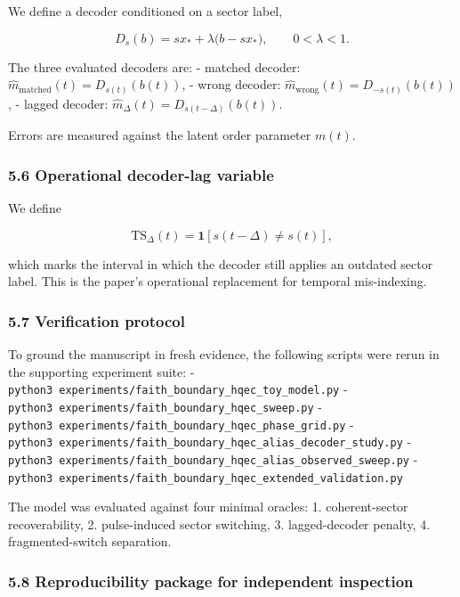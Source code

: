 \documentclass[
]{article}
\begin{document}
We define a decoder conditioned on a sector label,

\[
D_s(b)=s x_* + \lambda\big(b-sx_*\big), \qquad 0<\lambda<1.
\]

The three evaluated decoders are: - matched decoder:
\(\hat m_{\mathrm{matched}}(t)=D_{s(t)}(b(t))\), - wrong decoder:
\(\hat m_{\mathrm{wrong}}(t)=D_{-s(t)}(b(t))\), - lagged decoder:
\(\hat m_\Delta(t)=D_{s(t-\Delta)}(b(t))\).

Errors are measured against the latent order parameter \(m(t)\).

\subsubsection{5.6 Operational decoder-lag
variable}\label{operational-decoder-lag-variable}

We define

\[
\mathrm{TS}_\Delta(t)=\mathbf{1}[s(t-\Delta)\neq s(t)],
\]

which marks the interval in which the decoder still applies an outdated
sector label. This is the paper's operational replacement for temporal
mis-indexing.

\subsubsection{5.7 Verification protocol}\label{verification-protocol}

To ground the manuscript in fresh evidence, the following scripts were
rerun in the supporting experiment suite: -
\texttt{python3\ experiments/faith\_boundary\_hqec\_toy\_model.py} -
\texttt{python3\ experiments/faith\_boundary\_hqec\_sweep.py} -
\texttt{python3\ experiments/faith\_boundary\_hqec\_phase\_grid.py} -
\texttt{python3\ experiments/faith\_boundary\_hqec\_alias\_decoder\_study.py}
-
\texttt{python3\ experiments/faith\_boundary\_hqec\_alias\_observed\_sweep.py}
-
\texttt{python3\ experiments/faith\_boundary\_hqec\_extended\_validation.py}

The model was evaluated against four minimal oracles: 1. coherent-sector
recoverability, 2. pulse-induced sector switching, 3. lagged-decoder
penalty, 4. fragmented-switch separation.

\subsubsection{5.8 Reproducibility package for independent
inspection}\label{reproducibility-package-for-independent-inspection}
\end{document}
